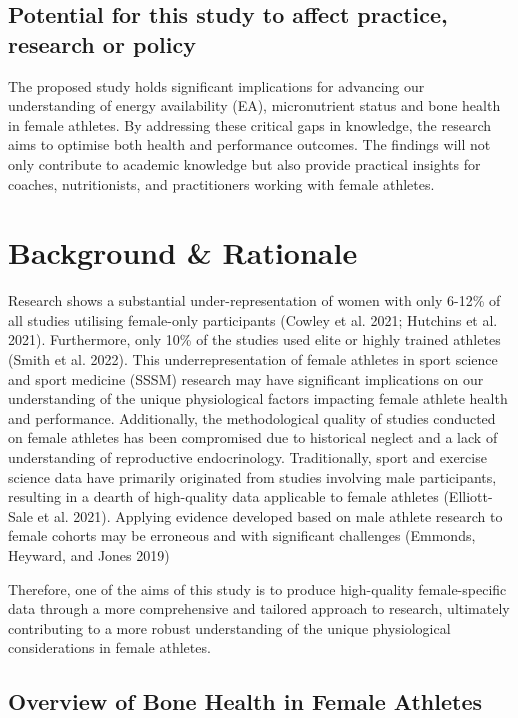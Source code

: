\documentclass[
]{article}
\begin{document}
\subsection{Potential for this study to affect practice, research or policy}\label{potential-for-this-study-to-affect-practice-research-or-policy}

The proposed study holds significant implications for advancing our understanding of energy availability (EA), micronutrient status and bone health in female athletes. By addressing these critical gaps in knowledge, the research aims to optimise both health and performance outcomes. The findings will not only contribute to academic knowledge but also provide practical insights for coaches, nutritionists, and practitioners working with female athletes.

\section{Background \& Rationale}\label{background-rationale}

Research shows a substantial under-representation of women with only 6-12\% of all studies utilising female-only participants (Cowley et al. 2021; Hutchins et al. 2021). Furthermore, only 10\% of the studies used elite or highly trained athletes (Smith et al. 2022). This underrepresentation of female athletes in sport science and sport medicine (SSSM) research may have significant implications on our understanding of the unique physiological factors impacting female athlete health and performance. Additionally, the methodological quality of studies conducted on female athletes has been compromised due to historical neglect and a lack of understanding of reproductive endocrinology. Traditionally, sport and exercise science data have primarily originated from studies involving male participants, resulting in a dearth of high-quality data applicable to female athletes (Elliott-Sale et al. 2021). Applying evidence developed based on male athlete research to female cohorts may be erroneous and with significant challenges (Emmonds, Heyward, and Jones 2019)

Therefore, one of the aims of this study is to produce high-quality female-specific data through a more comprehensive and tailored approach to research, ultimately contributing to a more robust understanding of the unique physiological considerations in female athletes.

\subsection{Overview of Bone Health in Female Athletes}\label{overview-of-bone-health-in-female-athletes}
\end{document}
